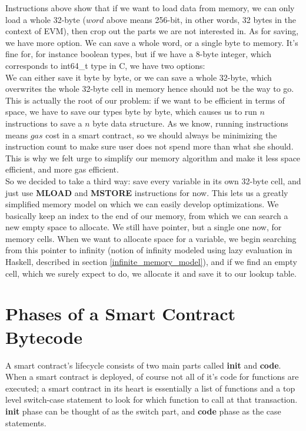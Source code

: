 \documentclass{article}
\begin{document}
Instructions above show that if we want to load data from memory, we can only load a whole 32-byte ($word$ above means 256-bit, in other words, 32 bytes in the context of EVM), then crop out the parts we are not interested in. As for saving, we have more option. We can save a whole word, or a single byte to memory. It's fine for, for instance boolean types, but if we have a 8-byte integer, which corresponds to int64\_t type in C, we have two options: \\
We can either save it byte by byte, or we can save a whole 32-byte, which overwrites the whole 32-byte cell in memory hence should not be the way to go. \\

This is actually the root of our problem: if we want to be efficient in terms of space, we have to save our types byte by byte, which causes us to run $n$ instructions to save a $n$ byte data structure. As we know, running instructions means $gas$ cost in a smart contract, so we should always be minimizing the instruction count to make sure user does not spend more than what she should. This is why we felt urge to simplify our memory algorithm and make it less space efficient, and more gas efficient. \\

So we decided to take a third way: save every variable in its own 32-byte cell, and just use \textbf{MLOAD} and \textbf{MSTORE} instructions for now. This lets us a greatly simplified memory model on which we can easily develop optimizations. We basically keep an index to the end of our memory, from which we can search a new empty space to allocate. We still have pointer, but a single one now, for memory cells. When we want to allocate space for a variable, we begin searching from this pointer to infinity (notion of infinity modeled using lazy evaluation in Haskell, described in section \ref{infinite_memory_model}), and if we find an empty cell, which we surely expect to do, we allocate it and save it to our lookup table.

\section{Phases of a Smart Contract Bytecode}
A smart contract's lifecycle consists of two main parts called \textbf{init} and \textbf{code}. When a smart contract is deployed, of course not all of it's code for functions are executed; a smart contract in its heart is essentially a list of functions and a top level switch-case statement to look for which function to call at that transaction. \textbf{init} phase can be thought of as the switch part, and \textbf{code} phase as the case statements. \\
\end{document}
